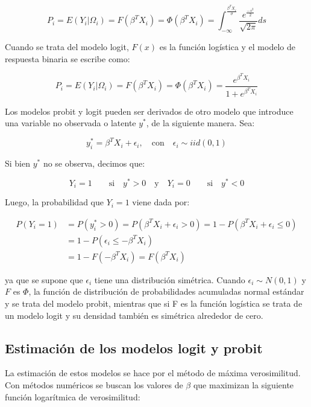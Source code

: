 \documentclass[
  12pt,
]{krantz}
\theoremstyle{definition}
\theoremstyle{definition}
\theoremstyle{definition}
\theoremstyle{remark}
\begin{document}
\[P_i=E(Y_i|\Omega_i)=F(\beta^TX_i)=\Phi(\beta^TX_i)=\int_{-\infty}^{\frac{\beta^TX_i}{\sigma}}\frac{e^{\frac{-s^2}{2}}}{\sqrt{2\pi}}ds
\label{eq:ecuacion8}\]

Cuando se trata del modelo logit, \(F(x)\) es la función logística y el modelo de respuesta binaria se escribe como:

\[P_i=E(Y_i|\Omega_i)=F(\beta^TX_i)=\Phi(\beta^TX_i)=\frac{e^{\beta^TX_i}}{1+e^{\beta^TX_i}}
\label{eq:ecuacion9}\]

Los modelos probit y logit pueden ser derivados de otro modelo que introduce una variable no observada o latente \(y^*\), de la siguiente manera. Sea:

\[y^*_i=\beta^TX_i+\epsilon_i, \quad \textrm{con} \quad \epsilon_i\sim iid(0,1)
\label{eq:ecuacion10}\]

Si bien \(y^*\) no se observa, decimos que:

\[Y_i=1\quad\quad\textrm{si} \quad y^*>0 \quad \textrm{y} \quad Y_i=0\quad\quad\textrm{si} \quad y^*<0
\label{eq:ecuacion11}\]

Luego, la probabilidad que \(Y_i=1\) viene dada por:

\begin{equation} \label{eq1}
\begin{split}
P(Y_i=1) & = P(y_i^*>0)=P(\beta^TX_i+\epsilon_i>0)= 1-P(\beta^TX_i+\epsilon_i\leq 0)\\
& =1-P(\epsilon_i\leq -\beta^TX_i)\\
 & = 1-F(-\beta^TX_i)=F(\beta^TX_i)
\end{split}
\end{equation}

ya que se supone que \(\epsilon_i\) tiene una distribución simétrica. Cuando \(\epsilon_i \sim N(0,1)\) y \(F\) es \(\Phi\), la función de distribución de probabilidades acumuladas normal estándar y se trata del modelo probit, mientras que si F es la función logística se trata de un modelo logit y su densidad también es simétrica alrededor de cero.

\hypertarget{estimacion-de-los-modelos-logit-y-probit}{%
\subsection{Estimación de los modelos logit y probit}\label{estimacion-de-los-modelos-logit-y-probit}}

La estimación de estos modelos se hace por el método de máxima verosimilitud. Con métodos numéricos se buscan los valores de \(\beta\) que maximizan la siguiente función logarítmica de verosimilitud:
\end{document}
